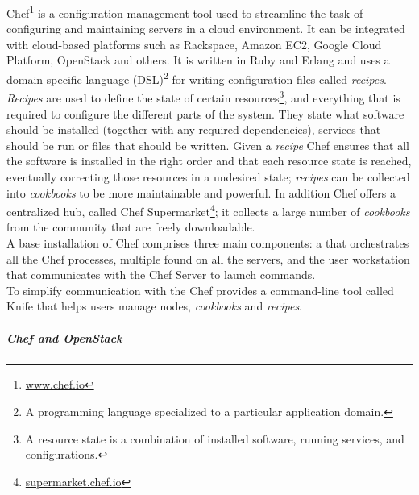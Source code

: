Chef\footnote{\url{www.chef.io}} is a configuration management tool used to streamline the task of configuring and maintaining servers in a cloud environment. It can be integrated with cloud-based platforms such as Rackspace, Amazon EC2, Google Cloud Platform, OpenStack and others. It is written in Ruby and Erlang and uses a domain-specific language (DSL)\footnote{A programming language specialized to a particular application domain.} for writing configuration files called \textit{recipes}. \textit{Recipes} are used to define the state of certain resources\footnote{A resource state is a combination of installed software, running services, and configurations.}, and everything that is required to configure the different parts of the system. They state what software should be installed (together with any required dependencies), services that should be run or files that should be written. Given a \textit{recipe} Chef ensures that all the software is installed in the right order and that each resource state is reached, eventually correcting those resources in a undesired state; \textit{recipes} can be collected into \textit{cookbooks} to be more maintainable and powerful. In addition Chef offers a centralized hub, called Chef Supermarket\footnote{\url{supermarket.chef.io}}; it collects a large number of \textit{cookbooks} from the community that are freely downloadable.\\
A base installation of Chef comprises three main components: a  that orchestrates all the Chef processes, multiple  found on all the servers, and the user workstation that communicates with the Chef Server to launch commands.\\
To simplify communication with the  Chef provides a command-line tool called Knife that helps users manage nodes, \textit{cookbooks} and \textit{recipes}.

\subparagraph{Chef and OpenStack}
\label{subp:sota_chef_openstack}


